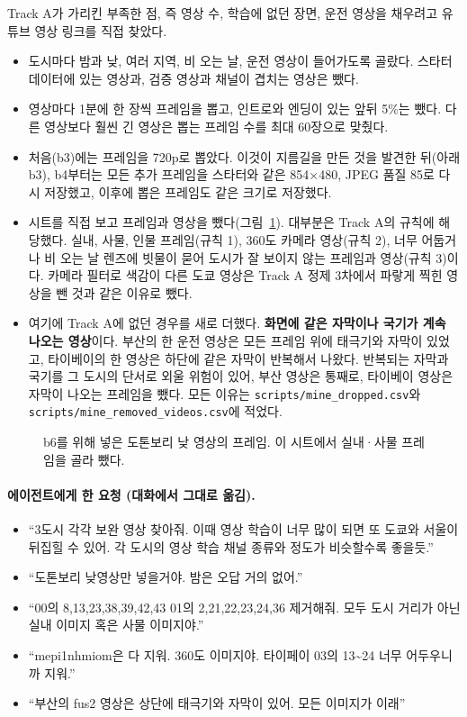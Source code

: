 \documentclass[11pt]{article}
\begin{document}
Track A가 가리킨 부족한 점, 즉 영상 수, 학습에 없던 장면, 운전 영상을 채우려고 유튜브 영상 링크를 직접 찾았다.
\begin{itemize}
\item 도시마다 밤과 낮, 여러 지역, 비 오는 날, 운전 영상이 들어가도록 골랐다. 스타터 데이터에 있는 영상과, 검증 영상과 채널이 겹치는 영상은 뺐다.
\item 영상마다 1분에 한 장씩 프레임을 뽑고, 인트로와 엔딩이 있는 앞뒤 5\%는 뺐다. 다른 영상보다 훨씬 긴 영상은 뽑는 프레임 수를 최대 60장으로 맞췄다.
\item 처음(b3)에는 프레임을 720p로 뽑았다. 이것이 지름길을 만든 것을 발견한 뒤(아래 b3), b4부터는 모든 추가 프레임을 스타터와 같은 854×480, JPEG 품질 85로 다시 저장했고, 이후에 뽑은 프레임도 같은 크기로 저장했다.
\item 시트를 직접 보고 프레임과 영상을 뺐다(그림~\ref{fig:dotonbori}). 대부분은 Track A의 규칙에 해당했다. 실내, 사물, 인물 프레임(규칙 1), 360도 카메라 영상(규칙 2), 너무 어둡거나 비 오는 날 렌즈에 빗물이 묻어 도시가 잘 보이지 않는 프레임과 영상(규칙 3)이다. 카메라 필터로 색감이 다른 도쿄 영상은 Track A 정제 3차에서 파랗게 찍힌 영상을 뺀 것과 같은 이유로 뺐다. \item 여기에 Track A에 없던 경우를 새로 더했다. \textbf{화면에 같은 자막이나 국기가 계속 나오는 영상}이다. 부산의 한 운전 영상은 모든 프레임 위에 태극기와 자막이 있었고, 타이베이의 한 영상은 하단에 같은 자막이 반복해서 나왔다. 반복되는 자막과 국기를 그 도시의 단서로 외울 위험이 있어, 부산 영상은 통째로, 타이베이 영상은 자막이 나오는 프레임을 뺐다. 모든 이유는 \texttt{scripts/mine\_dropped.csv}와 \texttt{scripts/mine\_removed\_videos.csv}에 적었다.
\end{itemize}

\begin{figure}[H]\centering
{}
\caption{b6를 위해 넣은 도톤보리 낮 영상의 프레임. 이 시트에서 실내·사물 프레임을 골라 뺐다.}
\label{fig:dotonbori}
\end{figure}

\paragraph{에이전트에게 한 요청 (대화에서 그대로 옮김).}
\begin{itemize}
\item ``3도시 각각 보완 영상 찾아줘. 이때 영상 학습이 너무 많이 되면 또 도쿄와 서울이 뒤집힐 수 있어. 각 도시의 영상 학습 채널 종류와 정도가 비슷할수록 좋을듯.''
\item ``도톤보리 낮영상만 넣을거야. 밤은 오답 거의 없어.''
\item ``00의 8,13,23,38,39,42,43 01의 2,21,22,23,24,36 제거해줘. 모두 도시 거리가 아닌실내 이미지 혹은 사물 이미지야.''
\item ``mepi1nhmiom은 다 지워. 360도 이미지야. 타이페이 03의 13\textasciitilde 24 너무 어두우니까 지워.''
\item ``부산의 fus2 영상은 상단에 태극기와 자막이 있어. 모든 이미지가 이래''
\end{itemize}
\end{document}
